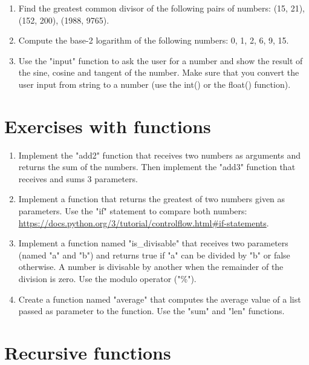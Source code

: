 \begin{enumerate}

\item Find the greatest common divisor of the following pairs of numbers: (15, 21), (152, 200), (1988, 9765). 

\item Compute the base-2 logarithm of the following numbers: 0, 1, 2, 6, 9, 15.

\item Use the "input" function to ask the user for a number and show the result of the sine, cosine and tangent of the number. Make sure that you convert the user input from string to a number (use the int() or the float() function).

\end{enumerate}

\section{Exercises with functions}

\begin{enumerate}

\item Implement the "add2" function that receives two numbers as arguments and returns the sum of the numbers. Then implement the "add3" function that receives and sums 3 parameters.

\item Implement a function that returns the greatest of two numbers given as parameters. Use the "if" statement to compare both numbers: \url{https://docs.python.org/3/tutorial/controlflow.html#if-statements}.

\item Implement a function named "is\_divisable" that receives two parameters (named "a" and "b") and returns true if "a" can be divided by "b" or false otherwise. A number is divisable by another when the remainder of the division is zero. Use the modulo operator ("\%").

\item Create a function named "average" that computes the average value of a list passed as parameter to the function. Use the "sum" and "len" functions.

\end{enumerate}

\section{Recursive functions}

